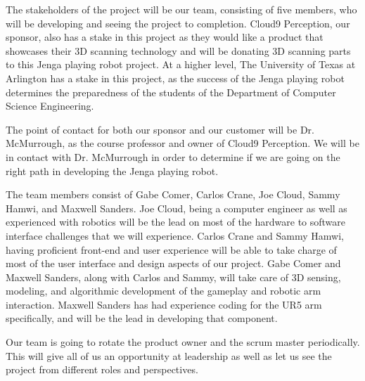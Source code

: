 The stakeholders of the project will be our team, consisting of five members, who will be developing and seeing the project to completion. Cloud9 Perception, our sponsor, also has a stake in this project as they would like a product that showcases their 3D scanning technology and will be donating 3D scanning parts to this Jenga playing robot project. At a higher level, The University of Texas at Arlington has a stake in this project, as the success of the Jenga playing robot determines the preparedness of the students of the Department of Computer Science Engineering.

The point of contact for both our sponsor and our customer will be Dr. McMurrough, as the course professor and owner of Cloud9 Perception. We will be in contact with Dr. McMurrough in order to determine if we are going on the right path in developing the Jenga playing robot.

The team members consist of Gabe Comer, Carlos Crane, Joe Cloud, Sammy Hamwi, and Maxwell Sanders. Joe Cloud, being a computer engineer as well as experienced with robotics will be the lead on most of the hardware to software interface challenges that we will experience. Carlos Crane and Sammy Hamwi, having proficient front-end and user experience will be able to take charge of most of the user interface and design aspects of our project. Gabe Comer and Maxwell Sanders, along with Carlos and Sammy, will take care of 3D sensing, modeling, and algorithmic development of the gameplay and robotic arm interaction. Maxwell Sanders has had experience coding for the UR5 arm specifically, and will be the lead in developing that component.

Our team is going to rotate the product owner and the scrum master periodically. This will give all of us an opportunity at leadership as well as let us see the project from different roles and perspectives. 
